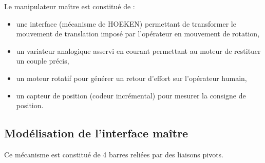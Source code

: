 Le manipulateur maître est constitué de :
\begin{itemize}
 \item une interface (mécanisme de HOEKEN) permettant de transformer le mouvement de
translation imposé par l'opérateur en mouvement de rotation,
 \item un variateur analogique asservi en courant permettant au moteur de restituer  un
couple précis,
 \item un moteur rotatif pour générer un retour d'effort sur l'opérateur humain,
 \item un capteur de position (codeur incrémental) pour mesurer la consigne de  position.
\end{itemize}

\subsection{Modélisation de l'interface maître}

Ce mécanisme est constitué de 4 barres reliées par des liaisons pivots.

